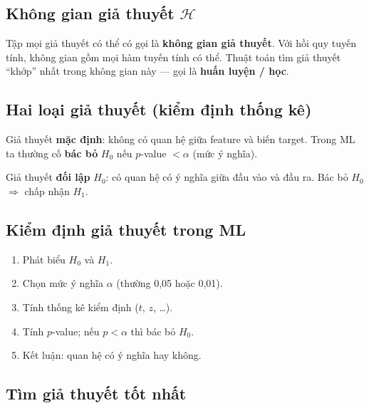 \subsection{Không gian giả thuyết $\mathcal{H}$}

\begin{dinhnghia}[title={Hypothesis space}]
Tập mọi giả thuyết có thể có gọi là \textbf{không gian giả thuyết}.
Với hồi quy tuyến tính, không gian gồm mọi hàm tuyến tính có thể.
Thuật toán tìm giả thuyết ``khớp'' nhất trong không gian này --- gọi là \textbf{huấn luyện / học}.
\end{dinhnghia}

\subsection{Hai loại giả thuyết (kiểm định thống kê)}

\begin{dinhnghia}[title={Null hypothesis ($H_0$)}]
Giả thuyết \textbf{mặc định}: không có quan hệ giữa feature và biến target.
Trong ML ta thường cố \textbf{bác bỏ} $H_0$ nếu $p$-value $< \alpha$ (mức ý nghĩa).
\end{dinhnghia}

\begin{dinhnghia}[title={Alternative hypothesis ($H_1$)}]
Giả thuyết \textbf{đối lập} $H_0$: có quan hệ có ý nghĩa giữa đầu vào và đầu ra.
Bác bỏ $H_0$ $\Rightarrow$ chấp nhận $H_1$.
\end{dinhnghia}

\subsection{Kiểm định giả thuyết trong ML}

\begin{phuongphap}[title={Các bước}]
\begin{enumerate}
  \item Phát biểu $H_0$ và $H_1$.
  \item Chọn mức ý nghĩa $\alpha$ (thường 0{,}05 hoặc 0{,}01).
  \item Tính thống kê kiểm định ($t$, $z$, \ldots).
  \item Tính $p$-value; nếu $p < \alpha$ thì bác bỏ $H_0$.
  \item Kết luận: quan hệ có ý nghĩa hay không.
\end{enumerate}
\end{phuongphap}

\subsection{Tìm giả thuyết tốt nhất}

